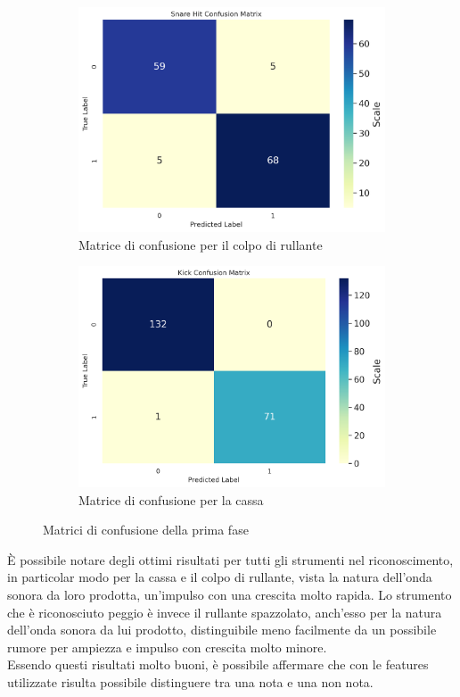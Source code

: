 \begin{figure}[h]
	\begin{subfigure}{.5\linewidth}
		\includegraphics[width=\linewidth]{./immagini/first_classification/sn_hit_cm.png}
		\caption{Matrice di confusione per il colpo di rullante}
		\label{fig:1c}
	\end{subfigure}\hfill
	\begin{subfigure}{.5\linewidth}
		\includegraphics[width=\linewidth]{./immagini/first_classification/kick_cm.png}
		\caption{Matrice di confusione per la cassa}
		\label{fig:1d}
	\end{subfigure}
	\caption{Matrici di confusione della prima fase}
	\label{fig:1}
\end{figure}

È possibile notare degli ottimi risultati per tutti gli strumenti nel riconoscimento, in particolar modo per la cassa e il colpo di rullante, vista la natura dell'onda sonora da loro prodotta, un'impulso con una crescita molto rapida. Lo strumento che è riconosciuto peggio è invece il rullante spazzolato, anch'esso per la natura dell'onda sonora da lui prodotto, distinguibile meno facilmente da un possibile rumore per ampiezza e impulso con crescita molto minore.\\
Essendo questi risultati molto buoni, è possibile affermare che con le features utilizzate risulta possibile distinguere tra una nota e una non nota.\\

